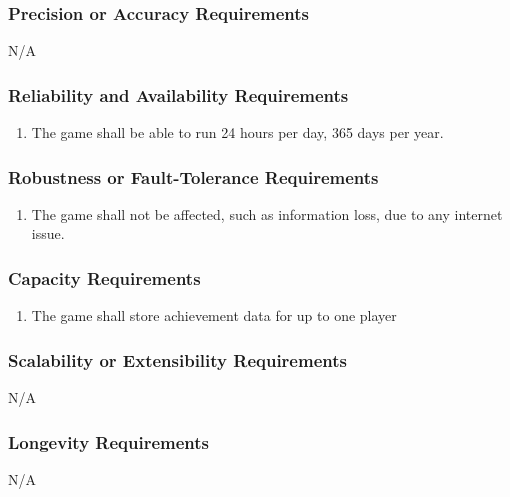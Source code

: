 \documentclass[12pt, titlepage]{article}
\begin{document}
\subsubsection{Precision or Accuracy Requirements}
\label{ssub:precision_or_accuracy_requirements}
N/A

\subsubsection{Reliability and Availability Requirements}
\label{ssub:reliability_and_availability_requirements}
\begin{enumerate}[start=3,label={ PR\arabic*.}]
	\item The game shall be able to run 24 hours per day, 365 days per year.
\end{enumerate}

\subsubsection{Robustness or Fault-Tolerance Requirements}
\label{ssub:robustness_or_fault_tolerance_requirements}
\begin{enumerate}[start=4,label={ PR\arabic*.}]
	\item The game shall not be affected, such as information loss, due to any internet issue.
\end{enumerate}

\subsubsection{Capacity Requirements}
\label{ssub:capacity_requirements}
\begin{enumerate}[start=5,label={ PR\arabic*.}]
	\item The game shall store achievement data for up to one player
	
\end{enumerate}

\subsubsection{Scalability or Extensibility Requirements}
\label{ssub:scalability_or_extensibility_requirements}
N/A

\subsubsection{Longevity Requirements}
\label{ssub:longevity_requirements}
N/A
\end{document}
